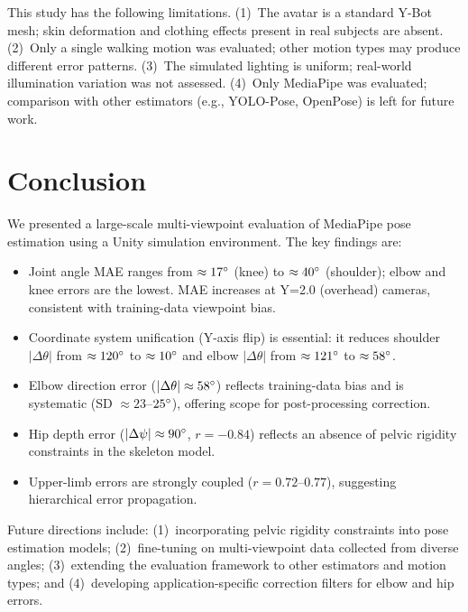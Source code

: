 \documentclass[twocolumn]{article}
\begin{document}
This study has the following limitations. (1)~The avatar is a standard
Y-Bot mesh; skin deformation and clothing effects present in real subjects
are absent. (2)~Only a single walking motion was evaluated; other motion
types may produce different error patterns. (3)~The simulated lighting is
uniform; real-world illumination variation was not assessed. (4)~Only
MediaPipe was evaluated; comparison with other estimators (e.g., YOLO-Pose,
OpenPose) is left for future work.

\section{Conclusion}

We presented a large-scale multi-viewpoint evaluation of MediaPipe pose
estimation using a Unity simulation environment. The key findings are:
\begin{itemize}\itemsep0pt
  \item Joint angle MAE ranges from $\approx17\degree{}$ (knee) to $\approx40\degree{}$
        (shoulder); elbow and knee errors are the lowest.
        MAE increases at Y=2.0 (overhead) cameras, consistent with
        training-data viewpoint bias.
  \item Coordinate system unification (Y-axis flip) is essential:
        it reduces shoulder $|\Delta\theta|$ from $\approx120\degree{}$ to
        $\approx10\degree{}$ and elbow $|\Delta\theta|$ from $\approx121\degree{}$ to
        $\approx58\degree{}$.
  \item Elbow direction error ($|\Delta\theta|\approx58\degree{}$) reflects
        training-data bias and is systematic (SD $\approx23$--$25\degree{}$),
        offering scope for post-processing correction.
  \item Hip depth error ($|\Delta\psi|\approx90\degree{}$, $r=-0.84$) reflects
        an absence of pelvic rigidity constraints in the skeleton model.
  \item Upper-limb errors are strongly coupled ($r=0.72$--$0.77$),
        suggesting hierarchical error propagation.
\end{itemize}

Future directions include: (1)~incorporating pelvic rigidity constraints
into pose estimation models; (2)~fine-tuning on multi-viewpoint data
collected from diverse angles; (3)~extending the evaluation framework to
other estimators and motion types; and (4)~developing application-specific
correction filters for elbow and hip errors.
\end{document}
